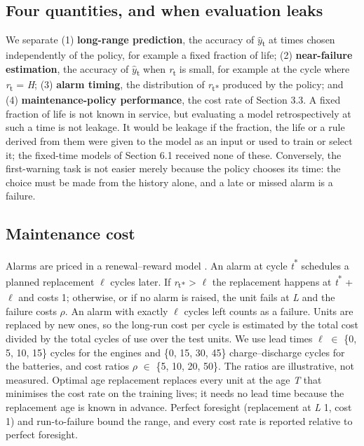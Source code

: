 \documentclass[a4paper,fleqn,doubleblind]{cas-dc}
\begin{document}
\subsection{Four quantities, and when evaluation leaks}

We separate (1) \textbf{long-range prediction}, the accuracy of $\hat{y}$\textsubscript{t} at times chosen independently of the policy, for example a fixed fraction of life; (2) \textbf{near-failure estimation}, the accuracy of $\hat{y}$\textsubscript{t} when \textit{r}\textsubscript{t} is small, for example at the cycle where \textit{r}\textsubscript{t} = \textit{H}; (3) \textbf{alarm timing}, the distribution of \textit{r}\textsubscript{t*} produced by the policy; and (4) \textbf{maintenance-policy performance}, the cost rate of Section 3.3. A fixed fraction of life is not known in service, but evaluating a model retrospectively at such a time is not leakage. It would be leakage if the fraction, the life or a rule derived from them were given to the model as an input or used to train or select it; the fixed-time models of Section 6.1 received none of these. Conversely, the first-warning task is not easier merely because the policy chooses its time: the choice must be made from the history alone, and a late or missed alarm is a failure.

\subsection{Maintenance cost}

Alarms are priced in a renewal--reward model \cite{barlow1960}. An alarm at cycle \textit{t}\textsuperscript{*} schedules a planned replacement $\ell$ cycles later. If \textit{r}\textsubscript{t*} > $\ell$ the replacement happens at \textit{t}\textsuperscript{*} + $\ell$ and costs 1; otherwise, or if no alarm is raised, the unit fails at \textit{L} and the failure costs $\rho$. An alarm with exactly $\ell$ cycles left counts as a failure. Units are replaced by new ones, so the long-run cost per cycle is estimated by the total cost divided by the total cycles of use over the test units. We use lead times $\ell$ $\in$ \{0, 5, 10, 15\} cycles for the engines and \{0, 15, 30, 45\} charge--discharge cycles for the batteries, and cost ratios $\rho$ $\in$ \{5, 10, 20, 50\}. The ratios are illustrative, not measured. Optimal age replacement replaces every unit at the age \textit{T} that minimises the cost rate on the training lives; it needs no lead time because the replacement age is known in advance. Perfect foresight (replacement at \textit{L} \textminus{} 1, cost 1) and run-to-failure bound the range, and every cost rate is reported relative to perfect foresight.
\end{document}
